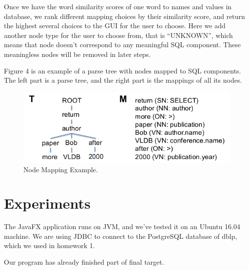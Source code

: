 \documentclass[twocolumn]{article}
\begin{document}
Once we have the word similarity scores of one word to names and values in database, we rank different mapping choices by their similarity score, and return the highest several choices to the GUI for the user to choose. Here we add another node type for the user to choose from, that is “UNKNOWN”, which means that node doesn’t correspond to any meaningful SQL component. These meaningless nodes will be removed in later steps.

Figure 4 is an example of a parse tree with nodes mapped to SQL components. The left part is a parse tree, and the right part is the mappings of all its nodes.

\begin{figure}[ht]
  \centering
  \includegraphics[width=0.9\linewidth]{figures/nodes_mapping_example.png}
  \caption[caption for nodes mapping example]{Node Mapping Example.\protect\footnotemark }
\end{figure}



\section{Experiments}
The JavaFX application runs on JVM, and we’ve tested it on an Ubuntu 16.04 machine. We are using JDBC to connect to the PostgreSQL database of dblp, which we used in homework 1.

Our program has already finished part of final target. 
\end{document}
